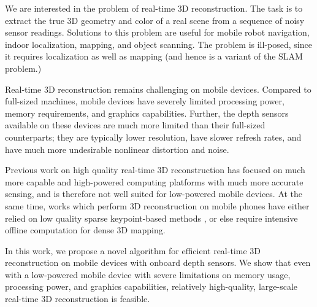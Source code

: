\documentclass[conference,10pt]{IEEEtran}
\begin{document}
We are interested in the problem of real-time 3D reconstruction. The task is to
extract the true 3D geometry and color of a real scene from a sequence of noisy
sensor readings. Solutions to this problem are useful for mobile robot navigation,
indoor localization, mapping, and object scanning. The problem is ill-posed,
since it requires localization as well as mapping (and hence is a variant of
the SLAM problem.)

Real-time 3D reconstruction remains challenging on mobile devices. Compared to
full-sized machines, mobile devices have severely limited processing power,
memory requirements, and graphics capabilities. Further, the depth sensors
available on these devices are much more limited than their full-sized
counterparts; they are typically lower resolution, have slower refresh rates,
and have much more undesirable nonlinear distortion and noise.

Previous work on high quality real-time 3D reconstruction \cite{Newcombe,
Whelan2013, Bylow2013, DTAM} has focused on much more capable and high-powered
computing platforms with much more accurate sensing, and is therefore not well
suited for low-powered mobile devices. At the same time, works which perform 3D
reconstruction on mobile phones have either relied on low quality sparse
keypoint-based methods \cite{KleinSparse}, or else require intensive offline
computation \cite{TanskanenMetric} for dense 3D mapping.

In this work, we propose a novel algorithm for efficient real-time 3D
reconstruction on mobile devices with onboard depth sensors. We show that even
with a low-powered mobile device with severe limitations on memory usage,
processing power, and graphics capabilities, relatively high-quality,
large-scale real-time 3D reconstruction is feasible.
\end{document}

